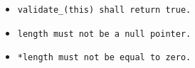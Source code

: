 \begin{itemize}

\item \tt{validate_(this)} shall return \tt{true}.

\item \phantom{*}\tt{length} must not be a null pointer.

\item \tt{*length} must not be equal to zero.

\end{itemize}
